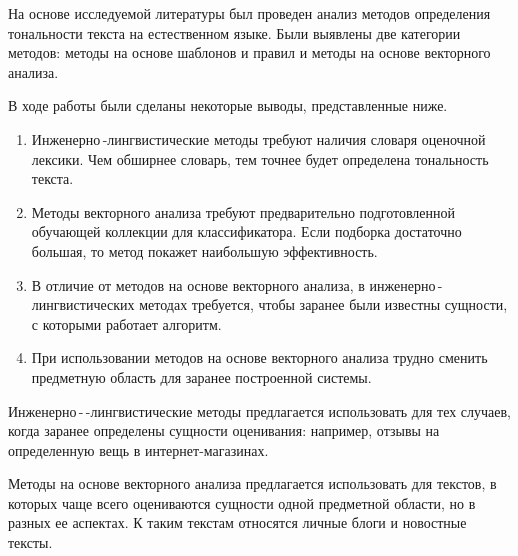 На основе исследуемой литературы был проведен анализ методов определения тональности текста на естественном языке. Были выявлены две категории методов: методы на основе шаблонов и правил и методы на основе векторного анализа. 

В ходе работы были сделаны некоторые выводы, представленные ниже.
\begin{enumerate}
	\item Инженерно\,-лингвистические методы требуют наличия словаря оценочной лексики. Чем обширнее словарь, тем точнее будет определена тональность текста.
	\item Методы векторного анализа требуют предварительно подготовленной обучающей коллекции для классификатора. Если подборка достаточно большая, то метод покажет наибольшую эффективность. 
	\item В отличие от методов на основе векторного анализа, в инженерно\,-\,лингвистических методах требуется, чтобы заранее были известны сущности, с которыми работает алгоритм.  
	\item При использовании методов на основе векторного анализа трудно сменить предметную область для заранее построенной системы. 
\end{enumerate} 


Инженерно\,-\,-лингвистические методы предлагается использовать для тех случаев, когда заранее определены сущности оценивания: например, отзывы на определенную вещь в интернет-магазинах. 

Методы на основе векторного анализа предлагается использовать для текстов, в которых чаще всего оцениваются сущности одной предметной области, но в разных ее аспектах. К таким текстам относятся личные блоги и новостные тексты. 